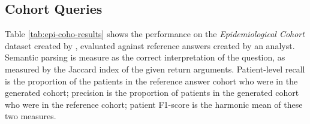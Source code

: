 \documentclass[11pt]{article}
\begin{document}
\subsection{Cohort Queries}
Table \ref{tab:epi-coho-results} shows the performance on the \textit{Epidemiological Cohort} dataset created by \citet{ziletti_generating_2025}, evaluated against reference answers created by an analyst.
Semantic parsing is measure as the correct interpretation of the question, as measured by the Jaccard index of the given return arguments.
Patient-level recall is the proportion of the patients in the reference answer cohort who were in the generated cohort; precision is the proportion of patients in the generated cohort who were in the reference cohort; patient F1-score is the harmonic mean of these two measures.

\begin{table}[ht!]
\centering
{}
\caption{
    QueryAgent's (QA) performance on 35 epidemiological cohort questions, with and without the Information Retrieval (IR) sub-agent, and with/without access to UMLS. We assess accuracy as a) whether or not the retrieved dataset exactly matches the expected dataset b) whether the type of query is correct, e.g. a count of patients versus a list of patients. Performance is automatically evaluated using an analyst created answer as ground-truth and averaged at the query level.
}

\label{tab:epi-coho-results}
\end{table}
\end{document}
